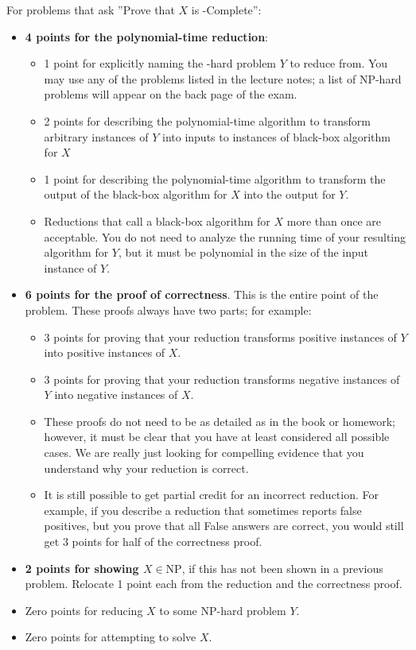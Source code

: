 \documentclass[12pt,answers,addpoints]{exam}
\newcommand{\class}[1]{\text{#1}}
\newcommand{\NP}{\class{NP}}
\begin{document}
For problems that ask ''Prove that $X$ is \NP-Complete'':

\begin{itemize}

\item \textbf{4 points for the polynomial-time reduction}:

  \begin{itemize}[label=+]
  \item 1 point for explicitly naming the \NP-hard problem $Y$ to
    reduce from. You may use any of the problems listed in the lecture
    notes; a list of NP-hard problems will appear on the back page of
    the exam.
  \item 2 points for describing the polynomial-time algorithm to
    transform arbitrary instances of $Y$ into inputs to instances of black-box
    algorithm for $X$

  \item 1 point for describing the polynomial-time algorithm to
    transform the output of the black-box algorithm for $X$ into the
    output for $Y$.

  \item Reductions that call a black-box algorithm for $X$ more than
    once are acceptable. You do not need to analyze the running time
    of your resulting algorithm for $Y$, but it must be polynomial in
    the size of the input instance of $Y$.
    
\end{itemize}
\item \textbf{6 points for the proof of correctness}. This is the
  entire point of the problem. These proofs always have two parts; for
  example:
  \begin{itemize}[label=+]
  \item 3 points for proving that your reduction transforms positive
    instances of $Y$ into positive instances of $X$.

  \item 3 points for proving that your reduction transforms negative
    instances of $Y$ into negative instances of $X$.

  \item These proofs do not need to be as detailed as in the book or
    homework; however, it must be clear that you have at least
    considered all possible cases. We are really just looking for
    compelling evidence that you understand why your reduction is
    correct.

  \item It is still possible to get partial credit for an incorrect
    reduction. For example, if you describe a reduction that sometimes
    reports false positives, but you prove that all False answers are
    correct, you would still get 3 points for half of the correctness
    proof.
  \end{itemize}
\item \textbf{2 points for showing $X\in\NP$}, if this has not been
  shown in a previous problem. Relocate 1 point each from the
  reduction and the correctness proof.

\item Zero points for reducing $X$ to some NP-hard problem $Y$.

\item Zero points for attempting to solve $X$.

\end{itemize}
\end{document}
